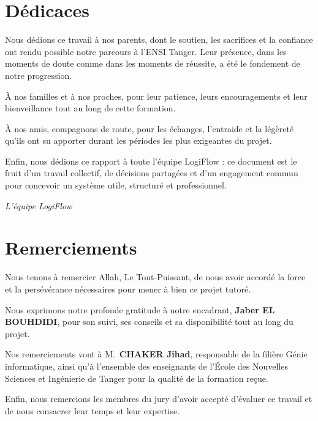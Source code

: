 
\chapter*{Dédicaces}

Nous dédions ce travail à nos parents, dont le soutien, les sacrifices et la confiance ont rendu possible notre parcours à l'ENSI Tanger. Leur présence, dans les moments de doute comme dans les moments de réussite, a été le fondement de notre progression.

À nos familles et à nos proches, pour leur patience, leurs encouragements et leur bienveillance tout au long de cette formation.

À nos amis, compagnons de route, pour les échanges, l'entraide et la légèreté qu'ils ont su apporter durant les périodes les plus exigeantes du projet.

Enfin, nous dédions ce rapport à toute l'équipe LogiFlow : ce document est le fruit d'un travail collectif, de décisions partagées et d'un engagement commun pour concevoir un système utile, structuré et professionnel.

\vspace{1.2em}
\begin{flushright}
\textit{L'équipe LogiFlow}
\end{flushright}

\clearpage
\chapter*{Remerciements}

Nous tenons à remercier Allah, Le Tout-Puissant, de nous avoir accordé la force et la persévérance nécessaires pour mener à bien ce projet tutoré.

Nous exprimons notre profonde gratitude à notre encadrant, \textbf{Jaber EL BOUHDIDI}, pour son suivi, ses conseils et sa disponibilité tout au long du projet.

Nos remerciements vont à M.~\textbf{CHAKER Jihad}, responsable de la filière Génie informatique, ainsi qu'à l'ensemble des enseignants de l'École des Nouvelles Sciences et Ingénierie de Tanger pour la qualité de la formation reçue.

Enfin, nous remercions les membres du jury d'avoir accepté d'évaluer ce travail et de nous consacrer leur temps et leur expertise.

